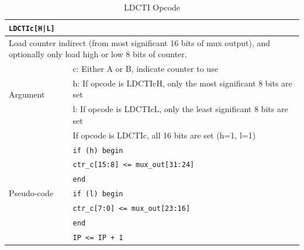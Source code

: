 \documentclass[main\_\_EN.tex]{subfiles}
\begin{document}
\begin{table}[H]
\caption{LDCTI Opcode}
\label{tab:bitscrm-ldcti-opcode}
\begin{tabular}{|l|l|}
\hline
\multicolumn{2}{|l|}{\texttt{LDCTIc[H|L]}} \\
\hline
\multicolumn{2}{|L{17cm}|}{Load counter indirect (from most significant 16 bits of mux output), and optionally only load high or low 8 bits of counter.} \\
\hline
\multirow{3}{*}{Argument} & c: Either A or B, indicate counter to use \\
& h: If opcode is LDCTIcH, only the most significant 8 bits are set\\
& l: If opcode is LDCTIcL, only the least significant 8 bits are set \\
& If opcode is LDCTIc, all 16 bits are set (h=1, l=1) \\
\hline
\multirow{7}{*}{Pseudo-code} & \texttt{if (h) begin} \\
& \hspace*{4mm} \texttt{ctr\_c[15:8] <= mux\_out[31:24]} \\
& \texttt{end} \\
& \texttt{if (l) begin} \\
& \hspace*{4mm} \texttt{ctr\_c[7:0] <= mux\_out[23:16]} \\
& \texttt{end} \\
& \texttt{IP <= IP + 1} \\
\hline
\end{tabular}
\end{table}
\end{document}

